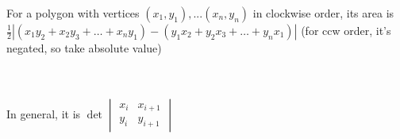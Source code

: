 For a polygon with vertices $(x_1, y_1), ... (x_n, y_n)$ in clockwise order,
its area is $\frac{1}{2}|(x_1y_2+x_2y_3+\dots+x_ny_1) - (y_1x_2+y_2x_3+\dots+y_nx_1)|$
(for ccw order, it's negated, so take absolute value)

\\
\\
In general, it is $\det \begin{vmatrix} x_i & x_{i+1} \\ y_i & y_{i+1} \end{vmatrix}$